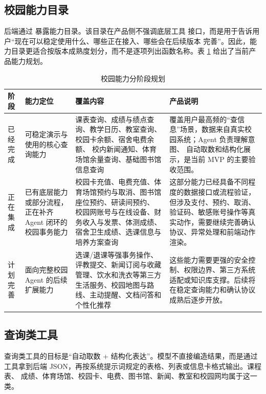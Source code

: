\documentclass[UTF8,a4paper,zihao=-4,fontset=none]{ctexart}
\newcommand{\api}[1]{\texttt{\detokenize{#1}}}
\begin{document}
\subsection{校园能力目录}

后端通过 \api{/api/capabilities} 暴露能力目录。该目录在产品侧不强调底层工具
接口，而是用于告诉用户“现在可以稳定使用什么、哪些正在接入、哪些会在后续版本
完善”。因此，能力目录更适合按版本成熟度划分，而不是逐项列出函数名称。表
\ref{tab:capability-roadmap} 给出了当前产品能力规划。

\begin{table}[H]
\centering
\caption{校园能力分阶段规划}
\label{tab:capability-roadmap}
\small
\begin{tabularx}{\textwidth}{p{2.1cm}p{3.0cm}X X}
\toprule
阶段 & 能力定位 & 覆盖内容 & 产品说明 \\
\midrule
已经完成 & 可稳定演示与使用的核心查询能力 &
课表查询、成绩与绩点查询、教学日历、教室查询、校园卡余额、宿舍电费余额、
校内新闻通知、体育场馆余量查询、基础图书馆信息查询 &
覆盖用户最高频的“查信息”场景，数据来自真实校园系统；Agent 负责理解意图、
自动取数和结构化展示，是当前 MVP 的主要验收范围。 \\
\midrule
正在集成 & 已有底层能力或部分流程，正在补齐 Agent 闭环的校园事务能力 &
校园卡充值、电费充值、体育场馆预约与取消、图书馆座位预约、研读间预约、
校园网账号与在线设备、财务收入与发票、体测成绩、宿舍卫生成绩、选课信息与
培养方案查询 &
这部分能力已经具备不同程度的数据接口或流程验证，但涉及支付、预约、取消、
验证码、敏感账号操作等真实动作，需要继续完善确认协议、异常处理和前端动作
渲染。 \\
\midrule
计划完善 & 面向完整校园 Agent 的后续扩展能力 &
选课/退课等强事务操作、评教提交、新闻订阅与收藏管理、饮水和洗衣等第三方
生活服务、校园地图与路线、主动提醒、文档问答和个性化推荐 &
这些能力需要更强的安全控制、权限边界、第三方系统适配或知识库支撑。后续将
在稳定查询能力和确认协议成熟后逐步开放。 \\
\bottomrule
\end{tabularx}
\end{table}

\subsection{查询类工具}

查询类工具的目标是“自动取数 + 结构化表达”。模型不直接编造结果，而是通过
工具拿到后端 JSON，再按系统提示词规定的表格、列表或信息卡格式输出。课程表、
成绩、体育场馆、校园卡、电费、图书馆、新闻、教室和校园网均属于这一类。
\end{document}
